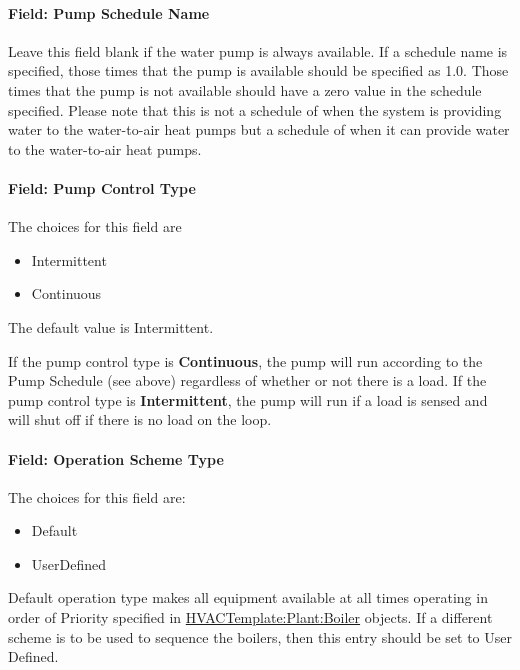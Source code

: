 \paragraph{Field: Pump Schedule Name}\label{field-pump-schedule-name-2}

Leave this field blank if the water pump is always available. If a schedule name is specified, those times that the pump is available should be specified as 1.0. Those times that the pump is not available should have a zero value in the schedule specified. Please note that this is not a schedule of when the system is providing water to the water-to-air heat pumps but a schedule of when it can provide water to the water-to-air heat pumps.

\paragraph{Field: Pump Control Type}\label{field-pump-control-type-2}

The choices for this field are

\begin{itemize}
\item
  Intermittent
\item
  Continuous
\end{itemize}

The default value is Intermittent.

If the pump control type is \textbf{Continuous}, the pump will run according to the Pump Schedule (see above) regardless of whether or not there is a load. If the pump control type is \textbf{Intermittent}, the pump will run if a load is sensed and will shut off if there is no load on the loop.

\paragraph{Field: Operation Scheme Type}\label{field-operation-scheme-type}

The choices for this field are:

\begin{itemize}
\item
  Default
\item
  UserDefined
\end{itemize}

Default operation type makes all equipment available at all times operating in order of Priority specified in \hyperref[hvactemplateplantboiler]{HVACTemplate:Plant:Boiler} objects. If a different scheme is to be used to sequence the boilers, then this entry should be set to User Defined.

